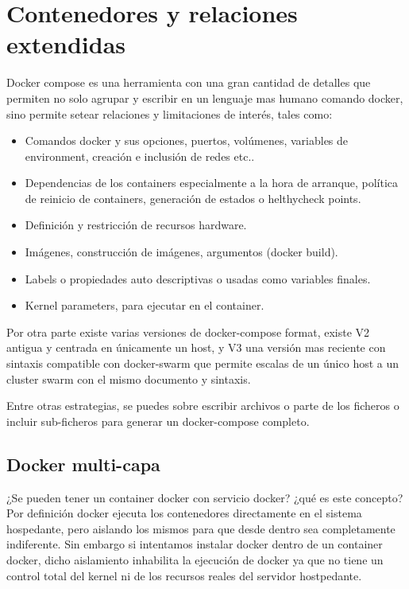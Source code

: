 \section{Contenedores y relaciones extendidas}\label{S:docker_compose_details}

Docker compose es una herramienta con una gran cantidad de detalles que permiten no solo agrupar y escribir en un lenguaje mas humano comando docker, sino permite setear relaciones y limitaciones de interés, tales como:
\begin{itemize}
    \item Comandos docker y sus opciones, puertos, volúmenes, variables de environment, creación e inclusión de redes etc..
    \item Dependencias de los containers especialmente a la hora de arranque, política de reinicio de containers, generación de estados o helthycheck points.
    \item Definición y restricción de recursos hardware.
    \item Imágenes, construcción de imágenes, argumentos (docker build).
    \item Labels o propiedades auto descriptivas o usadas como variables finales.
    \item Kernel parameters, para ejecutar en el container.
\end{itemize}

Por otra parte existe varias versiones de docker-compose format, existe V2\cite{c_docker_compose_v2} antigua y centrada en únicamente un host, y V3\cite{c_docker_compose_v3} una versión mas reciente con sintaxis compatible con docker-swarm que permite escalas de un único host a un cluster swarm con el mismo documento y sintaxis.

Entre otras estrategias, se puedes sobre escribir archivos o parte de los ficheros o incluir sub-ficheros para generar un docker-compose completo.

\subsection{Docker multi-capa}\label{S:docker_complex}
¿Se pueden tener un container docker con servicio docker? ¿qué es este concepto?
Por definición docker ejecuta los contenedores directamente en el sistema hospedante, pero aislando los mismos para que desde dentro sea completamente indiferente. Sin embargo si intentamos instalar docker dentro de un container docker, dicho aislamiento inhabilita la ejecución de docker ya que no tiene un control total del kernel ni de los recursos reales del servidor hostpedante.

